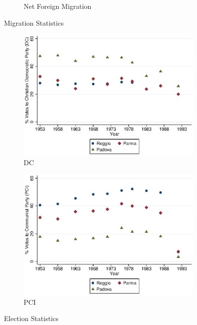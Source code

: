 \begin{figure}[H]
\begin{subfigure}[ht]{0.48\textwidth}
        \caption{Net Foreign Migration}
        \end{subfigure}

      \caption{Migration Statistics}  \label{fig:emigr-immigr}
    \end{figure}


    \begin{figure}[H]
      \centering
        \begin{subfigure}[t]{0.49\textwidth}
          \includegraphics[width=\textwidth]{../../output/image/DC.eps}
\caption{DC}
        \end{subfigure}
        \begin{subfigure}[t]{0.49\textwidth}
          \includegraphics[width=\textwidth]{../../output/image/PCI.eps}
 \caption{PCI}
        \end{subfigure}
      \caption{Election Statistics}  \label{fig:election}
    \end{figure}

